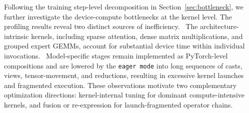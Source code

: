 
Following the training step-level decomposition in Section~\ref{sec:bottleneck}, we further investigate the device-compute bottlenecks at the kernel level. The profiling results reveal two distinct sources of inefficiency. ~The  architecture-intrinsic kernels, including sparse attention, dense matrix multiplications, and grouped expert GEMMs, account for substantial device time within individual invocations. ~Model-specific stages remain implemented as PyTorch-level compositions and are lowered by the \texttt{eager mode} into long sequences of casts, views, tensor-movement, and reductions, resulting in excessive kernel launches and fragmented execution. These observations motivate two complementary optimization directions: kernel-internal tuning for dominant compute-intensive kernels, and fusion or re-expression for launch-fragmented operator chains.

